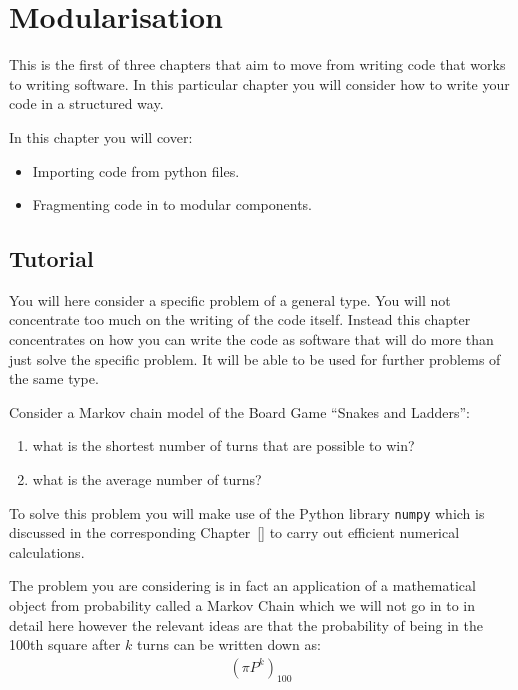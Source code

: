 \chapter{Modularisation}
\label{chp:modularisation}

This is the first of three chapters that aim to move from writing code
that works to writing software. In this particular chapter you will consider how
to write your code in a structured way.

In this chapter you will cover:
\begin{itemize}
    \item Importing code from python files.
    \item Fragmenting code in to modular components.
\end{itemize}


\section{Tutorial}
\label{sec:modularisation_tutorial}

You will here consider a specific problem of a general type. You will not
concentrate too much on the writing of the code itself. Instead this chapter
concentrates
on how you can write the code as software that will do more than just solve the
specific problem. It will be able to be used for further problems of the same
type.

Consider a Markov chain model of the Board Game “Snakes and Ladders”:
\begin{enumerate}

\item 

what is the shortest number of turns that are possible to win?

\item 

what is the average number of turns?

\end{enumerate}



To solve this problem you will make use of the Python library \texttt{numpy} which is
discussed in the corresponding Chapter~\ref{} to
carry out efficient numerical calculations.


The problem you are considering is in fact an application of a mathematical
object from probability called a Markov Chain which we will not go in to in
detail here however the relevant ideas are that the probability of being in the
100th square after \(k\) turns can be written down as:
\begin{equation*}
\begin{split}
    (\pi P ^ k)_{100}
\end{split}
\end{equation*}

